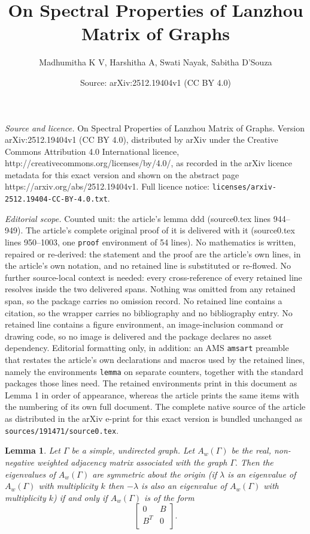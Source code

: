 \documentclass[10pt,a4paper]{amsart}
\title{On Spectral Properties of Lanzhou Matrix of Graphs}
\author{Madhumitha K V, Harshitha A, Swati Nayak, Sabitha D'Souza}
\date{Source: arXiv:2512.19404v1 (CC BY 4.0)}
\newtheorem{lemma}{Lemma}
\begin{document}
\maketitle

\noindent\emph{Source and licence.} On Spectral Properties of Lanzhou Matrix of Graphs. Version arXiv:2512.19404v1 (CC BY 4.0), distributed by arXiv under the Creative Commons Attribution 4.0 International licence, http://creativecommons.org/licenses/by/4.0/, as recorded in the arXiv licence metadata for this exact version and shown on the abstract page https://arxiv.org/abs/2512.19404v1. Full licence notice: \texttt{licenses/arxiv-2512.19404-CC-BY-4.0.txt}.\par\smallskip

\noindent\textit{Editorial scope.} Counted unit: the article's lemma ddd (source0.tex lines 944--949). The article's complete original proof of it is delivered with it (source0.tex lines 950--1003, one \texttt{proof} environment of 54 lines). No mathematics is written, repaired or re-derived: the statement and the proof are the article's own lines, in the article's own notation, and no retained line is substituted or re-flowed.  No further source-local context is needed: every cross-reference of every retained line resolves inside the two delivered spans.  Nothing was omitted from any retained span, so the package carries no omission record.  No retained line contains a citation, so the wrapper carries no bibliography and no bibliography entry.  No retained line contains a figure environment, an image-inclusion command or drawing code, so no image is delivered and the package declares no asset dependency.  Editorial formatting only, in addition: an AMS \texttt{amsart} preamble that restates the article's own declarations and macros used by the retained lines, namely the environments \texttt{lemma} on separate counters, together with the standard packages those lines need.  The retained environments print in this document as Lemma 1 in order of appearance, whereas the article prints the same items with the numbering of its own full document.  The complete native source of the article as distributed in the arXiv e-print for this exact version is bundled unchanged as \texttt{sources/191471/source0.tex}.
\begin{lemma}\label{ddd}
Let $\Gamma$ be a simple, undirected graph. Let $A_w(\Gamma)$ be the real, non-negative weighted adjacency matrix associated with the graph $\Gamma.$ Then the eigenvalues of $A_w(\Gamma)$ are symmetric about the origin (if $\lambda$ is an eigenvalue of $A_w(\Gamma)$ with multiplicity $k$ then $-\lambda$ is also an eigenvalue of $A_w(\Gamma)$ with multiplicity $k$) if and only if $A_w(\Gamma)$ is of the form  $$\begin{bmatrix}
0 & B\\
B^T & 0\\
\end{bmatrix}.$$
\end{lemma}
\end{document}
